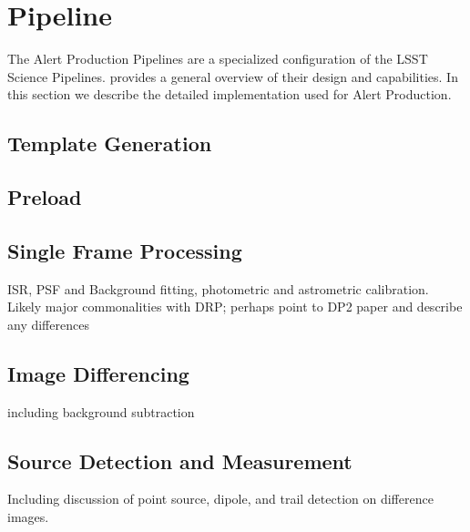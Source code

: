 
\section{Pipeline} \label{sec:pipeline}

The Alert Production Pipelines are a specialized configuration of the LSST Science Pipelines.
\citet{10.71929/rubin/2570545} provides a general overview of their design and capabilities.
In this section we describe the detailed implementation used for Alert Production.



\subsection{Template Generation}

%

\subsection{Preload} \label{sec:preload}

\subsection{Single Frame Processing}

ISR, PSF and Background fitting, photometric and astrometric calibration.  Likely major commonalities with DRP; perhaps point to DP2 paper and describe any differences

\subsection{Image Differencing}

including background subtraction

\subsection{Source Detection and Measurement}

Including discussion of point source, dipole, and trail detection on difference images.  


